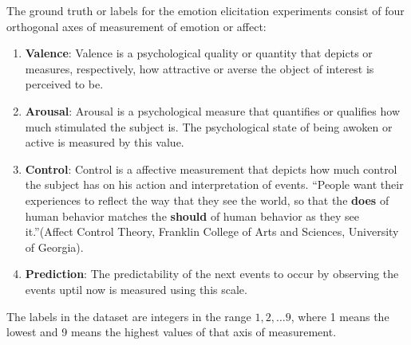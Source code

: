 The ground truth or labels for the emotion elicitation experiments consist of four orthogonal axes of measurement of emotion or affect:
\begin{enumerate}
    \item \textbf{Valence}: Valence is a psychological quality or quantity that depicts or measures, respectively, how attractive or averse the object of interest is perceived to be.
    \item \textbf{Arousal}: Arousal is a psychological measure that quantifies or qualifies how much stimulated the subject is. The psychological state of being awoken or active is measured by this value.
    \item \textbf{Control}: Control is a affective measurement that depicts how much control the subject has on his action and interpretation of events. ``People want their experiences to reflect the way that they see the world, so that the \textbf{does} of human behavior matches the \textbf{should} of human behavior as they see it.''(Affect Control Theory, Franklin College of Arts and Sciences, University of Georgia).
    \item \textbf{Prediction}: The predictability of the next events to occur by observing the events uptil now is measured using this scale.
\end{enumerate}
The labels in the dataset are integers in the range ${1, 2, \ldots 9}$, where 1 means the lowest and 9 means the highest values of that axis of measurement. 